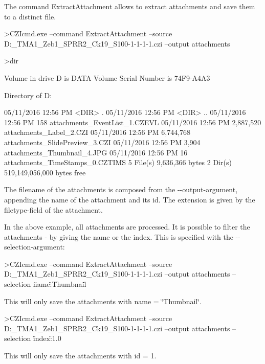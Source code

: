 The command \textquotesingle{}Extract\+Attachment\textquotesingle{} allows to extract attachments and save them to a distinct file. \begin{DoxyVerb}>CZIcmd.exe --command ExtractAttachment --source D:\PICTURES\NaCZIrTestData\Example_TMA1_Zeb1_SPRR2_Ck19_S100-1-1-1-1.czi --output attachments

>dir

 Volume in drive D is DATA
 Volume Serial Number is 74F9-A4A3

 Directory of D:\TFSJBL\LibCZIDistrib\Src\Build\VS{}\Release\out

05/11/2016  12:56 PM    <DIR>          .
05/11/2016  12:56 PM    <DIR>          ..
05/11/2016  12:56 PM               158 attachments_EventList_1.CZEVL
05/11/2016  12:56 PM         2,887,520 attachments_Label_2.CZI
05/11/2016  12:56 PM         6,744,768 attachments_SlidePreview_3.CZI
05/11/2016  12:56 PM             3,904 attachments_Thumbnail_4.JPG
05/11/2016  12:56 PM                16 attachments_TimeStamps_0.CZTIMS
               5 File(s)      9,636,366 bytes
               2 Dir(s)  519,149,056,000 bytes free
\end{DoxyVerb}


The filename of the attachments is composed from the -\/-\/output-\/argument, appending the name of the attachment and its id. The extension is given by the \textquotesingle{}filetype\textquotesingle{}-\/field of the attachment.

In the above example, all attachments are processed. It is possible to filter the attachments -\/ by giving the name or the index. This is specified with the -\/-\/selection-\/argument\+: \begin{DoxyVerb}>CZIcmd.exe --command ExtractAttachment --source D:\PICTURES\NaCZIrTestData\Example_TMA1_Zeb1_SPRR2_Ck19_S100-1-1-1-1.czi --output attachments --selection {\"name\":\"Thumbnail\"}
\end{DoxyVerb}


This will only save the attachments with \textquotesingle{}name\textquotesingle{} = \char`\"{}\+Thumbnail\char`\"{}. \begin{DoxyVerb}>CZIcmd.exe --command ExtractAttachment --source D:\PICTURES\NaCZIrTestData\Example_TMA1_Zeb1_SPRR2_Ck19_S100-1-1-1-1.czi --output attachments --selection {\"index\":1.0}
\end{DoxyVerb}


This will only save the attachments with id = 1. 